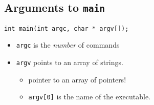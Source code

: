 \subsection{Arguments to \texttt{main}}
\begin{verbatim}
int main(int argc, char * argv[]);
\end{verbatim}
\begin{itemize}
	\item \texttt{argc} is the \emph{number} of commands
	\item \texttt{argv} points to an array of strings.
		\begin{itemize}
			\item pointer to an array of pointers!
			\item \texttt{argv[0]} is the name of the executable.
		\end{itemize}
\end{itemize}